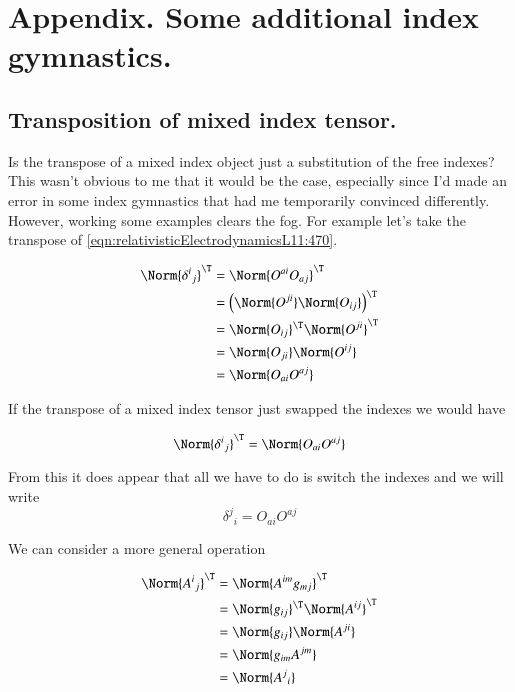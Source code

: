 \section{Appendix. Some additional index gymnastics.}

\subsection{Transposition of mixed index tensor.}

Is the transpose of a mixed index object just a substitution of the free indexes?  This wasn't obvious to me that it would be the case, especially since I'd made an error in some index gymnastics that had me temporarily convinced differently.  However, working some examples clears the fog.  For example let's take the transpose of \ref{eqn:relativisticElectrodynamicsL11:470}.  

\begin{align*}
\Norm{ {\delta^i}_j }^\T 
&= 
\Norm{ O^{a i} O_{a j} }^\T \\
&= 
\left( \Norm{ O^{j i} } \Norm{ O_{i j} } \right)^\T \\
&=
\Norm{ O_{i j} }^\T
\Norm{ O^{j i} }^\T  \\
&=
\Norm{ O_{j i} }
\Norm{ O^{i j} } \\
&=
\Norm{ O_{a i} O^{a j} } \\
\end{align*}

If the transpose of a mixed index tensor just swapped the indexes we would have

\begin{equation}\label{eqn:relativisticElectrodynamicsL11:1060}
\Norm{ {\delta^i}_j }^\T = \Norm{ O_{a i} O^{a j} } 
\end{equation}

From this it does appear that all we have to do is switch the indexes and we will write
\begin{equation}\label{eqn:relativisticElectrodynamicsL11:1060b}
{\delta^j}_i = O_{a i} O^{a j} 
\end{equation}

We can consider a more general operation

\begin{align*}
\Norm{{A^i}_j}^\T
&=
\Norm{ A^{i m} g_{m j} }^\T \\
&=
\Norm{ g_{i j} }^\T
\Norm{ A^{i j} }^\T 
 \\
&=
\Norm{ g_{i j} }
\Norm{ A^{j i} }
 \\
&=
\Norm{ g_{i m} A^{j m} }
 \\
&=
\Norm{ {A^{j}}_i }
\end{align*}

